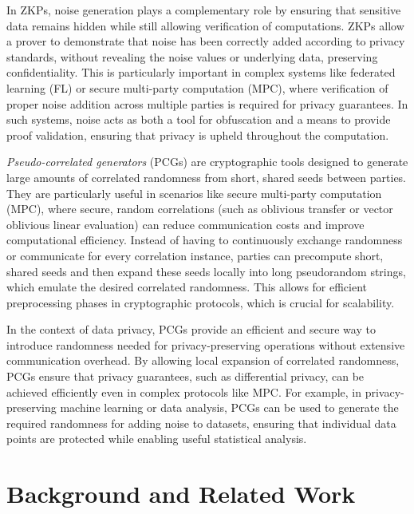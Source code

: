 \documentclass[11pt]{article}
\begin{document}
    In ZKPs, noise generation plays a complementary role by ensuring that sensitive data remains hidden while still allowing verification of computations.
    ZKPs allow a prover to demonstrate that noise has been correctly added according to privacy standards, without revealing the noise values or underlying data, preserving confidentiality. 
    This is particularly important in complex systems like federated learning (FL) or secure multi-party computation (MPC), where verification of proper noise addition across multiple parties is required for privacy guarantees. 
    In such systems, noise acts as both a tool for obfuscation and a means to provide proof validation, ensuring that privacy is upheld throughout the computation.
    
    \emph{Pseudo-correlated generators} (PCGs) are cryptographic tools designed to generate large amounts of correlated randomness from short, shared seeds between parties. 
    They are particularly useful in scenarios like secure multi-party computation (MPC), where secure, random correlations (such as oblivious transfer or vector oblivious linear evaluation) can reduce communication costs and improve computational efficiency. 
    Instead of having to continuously exchange randomness or communicate for every correlation instance, parties can precompute short, shared seeds and then expand these seeds locally into long pseudorandom strings, which emulate the desired correlated randomness. 
    This allows for efficient preprocessing phases in cryptographic protocols, which is crucial for scalability.

    In the context of data privacy, PCGs provide an efficient and secure way to introduce randomness needed for privacy-preserving operations without extensive communication overhead. 
    By allowing local expansion of correlated randomness, PCGs ensure that privacy guarantees, such as differential privacy, can be achieved efficiently even in complex protocols like MPC. 
    For example, in privacy-preserving machine learning or data analysis, PCGs can be used to generate the required randomness for adding noise to datasets, ensuring that individual data points are protected while enabling useful statistical analysis.

\section{Background and Related Work}
\end{document}
